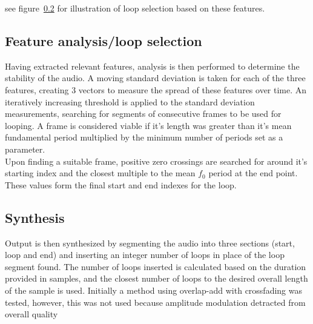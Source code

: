 \documentclass[titlepage]{scrartcl}
\begin{document}
see figure~\ref{} for illustration of loop
selection based on these features.
\subsection{Feature analysis/loop selection}
Having extracted relevant features, analysis is then performed to determine
the stability of the audio.  A moving standard deviation is taken for each of
the three features, creating 3 vectors to measure the spread of these features
over time.  An iteratively increasing threshold is applied to the standard
deviation measurements, searching for segments of consecutive frames to be used
for looping. A frame is considered viable if it's length was greater than it's
mean fundamental period multiplied by the minimum number of periods set as a
parameter.\\
Upon finding a suitable frame, positive zero crossings are searched for around
it's starting index and the closest multiple to the mean $f_0$ period at the end
point. These values form the final start and end indexes for the loop.

\subsection{Synthesis}
Output is then synthesized by segmenting the audio into three sections (start,
loop and end) and inserting an integer number of loops in place of
the loop segment found. The number of loops inserted is calculated based on the
duration provided in samples, and the closest number of loops to the desired
overall length of the sample is used.
Initially a method using overlap-add with crossfading was tested, however, this
was not used because amplitude modulation detracted from overall quality
\end{document}
